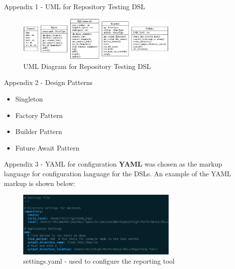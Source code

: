 
\begin{frame}{Appendix 1 - UML for Repository Testing DSL}
\begin{figure}[H]
  \centering
    \includegraphics[width=300px]{figures/python_dsl_classes.png}
  \caption{UML Diagram for Repository Testing DSL}
\end{figure}
\end{frame}

\begin{frame}{Appendix 2 - Design Patterns}
\begin{itemize}
\item Singleton
\item Factory Pattern
\item Builder Pattern
\item Future Await Pattern
\end{itemize}
\end{frame}

\begin{frame}{Appendix 3 - YAML for configuration}
\textbf{YAML} was chosen as the markup language for configuration language for the DSLs. An example of the YAML markup is shown below:
\begin{figure}[H]
  \centering
    \includegraphics[width=300px]{figures/settings.png}
  \caption{settings.yaml - used to configure the reporting tool}
\end{figure}
\end{frame}

